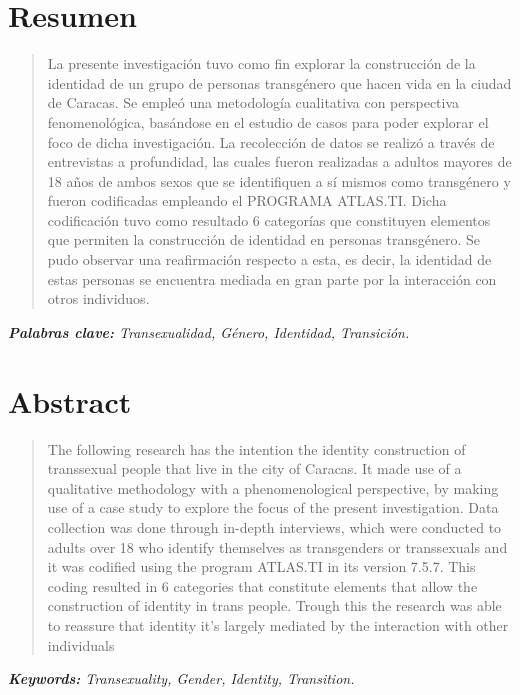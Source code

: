
\chapter{Resumen}
\begin{center}
	\large \scshape \thetitle
\end{center}

\begin{quote}
La presente investigación tuvo como fin explorar la construcción de la identidad
de un grupo de personas transgénero que hacen vida en la ciudad de Caracas.
Se empleó una metodología cualitativa con perspectiva fenomenológica, basándose
en el estudio de casos para poder explorar el foco de dicha investigación.
La recolección de datos se realizó a través de entrevistas a profundidad, las
cuales fueron realizadas a adultos mayores de 18 años de ambos sexos que se
identifiquen a sí mismos como transgénero y fueron codificadas empleando el
PROGRAMA ATLAS.TI.
Dicha codificación tuvo como resultado 6 categorías que constituyen elementos
que permiten la construcción de identidad en personas transgénero.
Se pudo observar una reafirmación respecto a esta, es decir, la identidad de
estas personas se encuentra mediada en gran parte por la interacción con otros
individuos.
\end{quote}

\itshape \textbf{Palabras clave:} \normalfont Transexualidad, Género, Identidad,
Transición.

\chapter{Abstract}

\begin{center}
	\large \scshape \theengtitle
\end{center}

\begin{quote}
The following research has the intention the identity construction of
transsexual people that live in the city of Caracas.
It made use of a qualitative methodology with a phenomenological perspective, by
making use of a case study to explore the focus of the present investigation.
Data collection was done through in-depth interviews, which were conducted to
adults over 18 who identify themselves as transgenders or transsexuals and it
was codified using the program ATLAS.TI in its version 7.5.7.
This coding resulted in 6 categories that constitute elements that allow the
construction of identity in trans people.
Trough this the research was able to reassure that identity it's largely
mediated by the interaction with other individuals

\end{quote}

\itshape \textbf{Keywords:} \normalfont Transexuality, Gender, Identity,
Transition.

\cleardoublepage